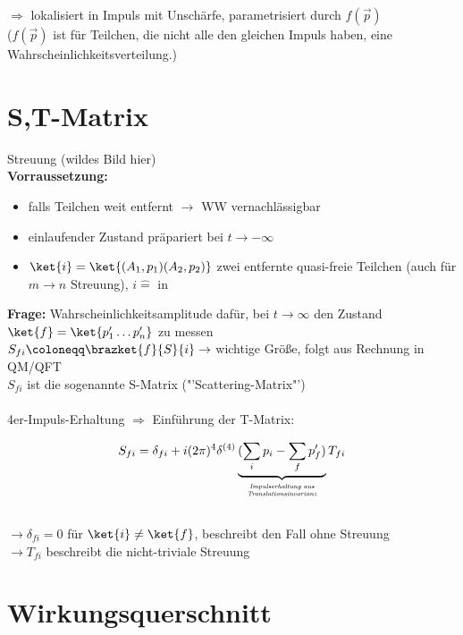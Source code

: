 $\Rightarrow$ lokalisiert in Impuls mit Unschärfe, parametrisiert durch 
$f(\vec{p})$ \\
($f(\vec{p})$ ist für Teilchen, die nicht alle den gleichen Impuls haben, eine 
Wahrscheinlichkeitsverteilung.)

\section{S,T-Matrix}

Streuung (wildes Bild hier) \\
\textbf{Vorraussetzung:}

\begin{itemize}
\item falls Teilchen weit entfernt $\rightarrow$ WW vernachlässigbar
\item einlaufender Zustand präpariert bei $ t \rightarrow -\infty$
\item $\ket{i} = \ket{(A_1,p_1)(A_2,p_2)}$ zwei entfernte quasi-freie Teilchen 
(auch für $m \rightarrow n$ Streuung), $i \mathrel{\hat=}$ \glqq in $\!$\grqq
\end{itemize}
\textbf{Frage:} Wahrscheinlichkeitsamplitude dafür, bei $t \to \infty$ den 
Zustand $\ket{f}=\ket{p'_1 \dots p'_n}$ zu messen  \\
$S_{fi} \coloneqq \brazket{f}{S}{i} \rightarrow$ wichtige Größe, folgt aus 
Rechnung in QM/QFT\\
$S_{fi}$ ist die sogenannte S-Matrix ("'Scattering-Matrix"') \\ \\

4er-Impuls-Erhaltung $\Rightarrow$ Einführung der T-Matrix: 

\[ S_{fi} = \delta_{fi} + i (2\pi)^4 \delta^{(4)}\underbrace{(\sum_i p_i - 
\sum_f p'_f )}_{\tiny{\begin{matrix}\textit{Impulserhaltung aus} \\ 
\textit{Translationsinvarianz}\end{matrix}} } T_{fi} \] \\
$ \longrightarrow \delta_{fi}=0$ für $\ket{i} \neq \ket{f}$, beschreibt den 
Fall ohne Streuung\\
$ \longrightarrow T_{fi}$ beschreibt die nicht-triviale Streuung

\section{Wirkungsquerschnitt}

